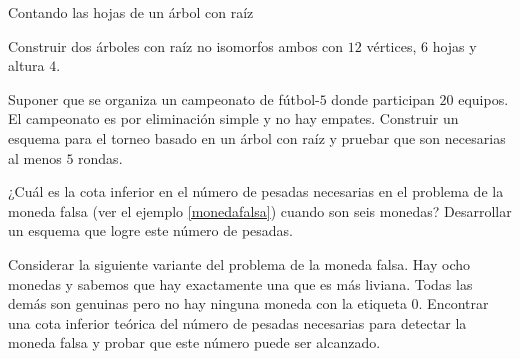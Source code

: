 \begin{section}{Contando las hojas de un árbol con raíz}
\begin{enumex}
\item Construir dos árboles con raíz no isomorfos ambos con $12$ vértices, $6$ hojas y altura $4$.    
    
\item Suponer que se organiza un campeonato de fútbol-$5$ donde participan $20$ equipos. El cam\-peo\-na\-to es por eliminación simple y no hay empates. Cons\-truir un esquema para el torneo basado en un árbol con raíz y pruebar que son necesarias al menos $5$ rondas. 

\item ¿Cuál es la cota inferior en el número de pesadas necesarias en el problema de la moneda falsa (ver el ejemplo \ref{monedafalsa}) cuando son seis monedas? Desarrollar un esquema que logre este número de pesadas.

\item Considerar la siguiente variante del problema de la moneda falsa. Hay ocho monedas y sabemos que hay exactamente una que es más liviana. Todas las demás son genuinas pero no hay ninguna moneda con la etiqueta $0$. Encontrar una cota inferior teórica del número de pesadas necesarias para detectar la moneda falsa y probar que este número puede ser alcanzado.
\end{enumex}

\end{section}



